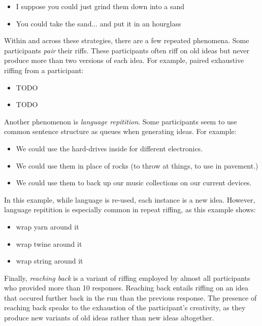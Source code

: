 \begin{itemize}
    \item I suppose you could just grind them down into a sand
    \item You could take the sand... and put it in an hourglass
\end{itemize}

Within and across these strategies, there are a few repeated phenomena.
Some participants \emph{pair} their riffs. These participants  often riff on old ideas but never produce more than two versions of each idea. For example, paired exhaustive riffing from a participant:

\begin{itemize}
\item TODO
\item TODO
\end{itemize}

Another phenomenon is \emph{language repitition}. Some participants seem to use common sentence structure as queues when generating ideas. For example:

\begin{itemize}
    \item We could use the hard-drives inside for different electronics.
    \item We could use them in place of rocks (to throw at things, to use in pavement.)
    \item We could use them to back up our music collections on our current devices.
\end{itemize}

In this example, while language is re-used, each instance is a new idea.
However, language repitition is especially common in repeat riffing, as this example shows:

\begin{itemize}
    \item wrap yarn around it
    \item wrap twine around it
    \item wrap string around it
\end{itemize}

Finally, \emph{reaching back} is a variant of riffing employed by almost all participants who provided more than 10 responses. Reaching back entails riffing on an idea that occured further back in the run than the previous response. The presence of reaching back speaks to the exhaustion of the participant's creativity, as they produce new variants of old ideas rather than new ideas altogether.

